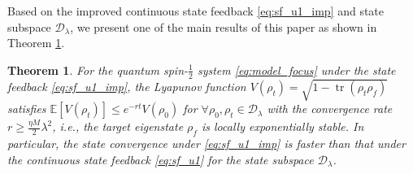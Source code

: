 \documentclass[]{elsarticle}
\newtheorem{thm}{Theorem}
\begin{document}
Based on the improved continuous state feedback \eqref{eq:sf_u1_imp} and state subspace $\mathcal{D}_\lambda$, we present one of the main results of this paper as shown in Theorem \ref{thm:exponentially_stable_csfimp}.
\begin{thm}\label{thm:exponentially_stable_csfimp}
	For the quantum spin-$\frac{1}{2}$ system \eqref{eq:model_focus} under the state feedback \eqref{eq:sf_u1_imp},  the Lyapunov function $V(\rho_{t})=\sqrt{1-\operatorname{tr}\left(\rho_t\rho_f\right)}$ satisfies $\mathbb{E}\left[V\left(\rho_{t}\right)\right]\le e^{-r t} V\left(\rho_{0}\right)$ for $\forall \rho_{0}, \rho_{t}\in \mathcal{D}_\lambda$ with the convergence rate $r\ge\frac{{\eta M}}{2}\lambda^{2}$, i.e., the target eigenstate $\rho_f$ is locally exponentially stable. In particular, the state convergence under  \eqref{eq:sf_u1_imp} is faster than that under the continuous state feedback \eqref{eq:sf_u1} for the state subspace $\mathcal{D}_\lambda$.
\end{thm}
\end{document}
